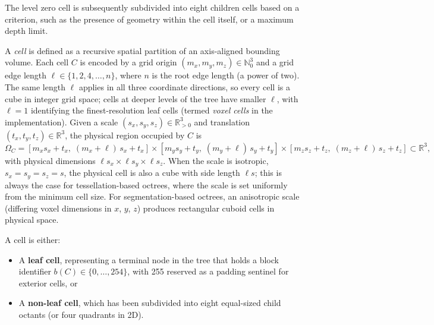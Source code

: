 \documentclass[review,12pt]{elsarticle}
\begin{document}
The level zero cell is subsequently subdivided into eight children cells based on a criterion, such as the presence of geometry within the cell itself, or a maximum depth limit.

A \emph{cell} is defined as a recursive spatial partition of an axis-aligned bounding volume. Each cell $C$ is encoded by a grid origin $(m_x, m_y, m_z) \in \mathbb{N}_0^3$ and a grid edge length $\ell \in \{1, 2, 4, \ldots, n\}$, where $n$ is the root edge length (a power of two). The same length $\ell$ applies in all three coordinate directions, so every cell is a cube in integer grid space; cells at deeper levels of the tree have smaller $\ell$, with $\ell = 1$ identifying the finest-resolution leaf cells (termed \emph{voxel cells} in the implementation). Given a scale $(s_x, s_y, s_z) \in \mathbb{R}_{>0}^3$ and translation $(t_x, t_y, t_z) \in \mathbb{R}^3$, the physical region occupied by $C$ is
\begin{equation}
  \Omega_C = [m_x s_x + t_x,\; (m_x{+}\ell)\,s_x + t_x]
           \times [m_y s_y + t_y,\; (m_y{+}\ell)\,s_y + t_y]
           \times [m_z s_z + t_z,\; (m_z{+}\ell)\,s_z + t_z]
           \subset \mathbb{R}^3,
\end{equation}
with physical dimensions $\ell s_x \times \ell s_y \times \ell s_z$.  When the scale is isotropic, $s_x = s_y = s_z = s$, the physical cell is also a cube with side length $\ell s$; this is always the case for tessellation-based octrees, where the scale is set uniformly from the minimum cell size.  For segmentation-based octrees, an anisotropic scale (differing voxel dimensions in $x$, $y$, $z$) produces rectangular cuboid cells in physical space.

A cell is either:

\begin{itemize}
  \item A \textbf{leaf cell}, representing a terminal node in the tree that holds a block identifier $b(C) \in \{0,\ldots,254\}$, with 255 reserved as a padding sentinel for exterior cells, or
  \item A \textbf{non-leaf cell}, which has been subdivided into eight equal-sized child octants (or four quadrants in 2D).
\end{itemize}
\end{document}
